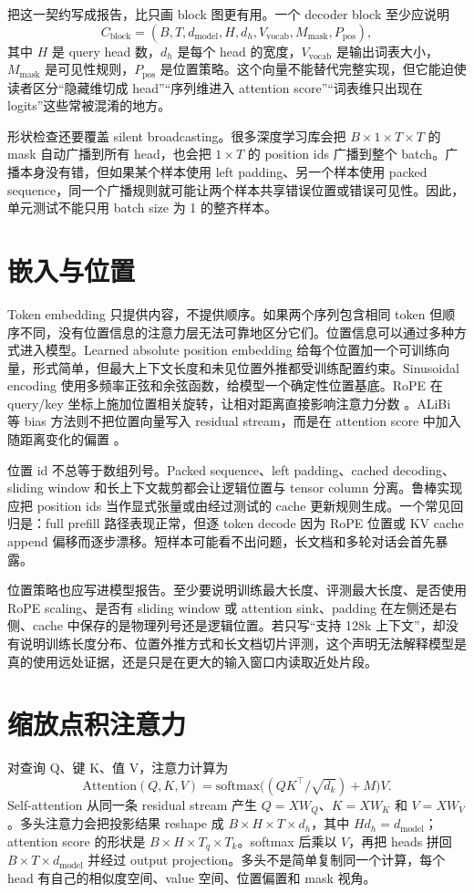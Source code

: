 \documentclass[UTF8,zihao=-4,openany]{ctexbook}
\begin{document}
把这一契约写成报告，比只画 block 图更有用。一个 decoder block 至少应说明
\[
  C_{\mathrm{block}}=(B,T,d_{\mathrm{model}},H,d_h,V_{\mathrm{vocab}},M_{\mathrm{mask}},P_{\mathrm{pos}}),
\]
其中 $H$ 是 query head 数，$d_h$ 是每个 head 的宽度，$V_{\mathrm{vocab}}$ 是输出词表大小，$M_{\mathrm{mask}}$ 是可见性规则，$P_{\mathrm{pos}}$ 是位置策略。这个向量不能替代完整实现，但它能迫使读者区分“隐藏维切成 head”“序列维进入 attention score”“词表维只出现在 logits”这些常被混淆的地方。

形状检查还要覆盖 silent broadcasting。很多深度学习库会把 $B\times1\times T\times T$ 的 mask 自动广播到所有 head，也会把 $1\times T$ 的 position ids 广播到整个 batch。广播本身没有错，但如果某个样本使用 left padding、另一个样本使用 packed sequence，同一个广播规则就可能让两个样本共享错误位置或错误可见性。因此，单元测试不能只用 batch size 为 1 的整齐样本。

\section{嵌入与位置}
Token embedding 只提供内容，不提供顺序。如果两个序列包含相同 token 但顺序不同，没有位置信息的注意力层无法可靠地区分它们。位置信息可以通过多种方式进入模型。Learned absolute position embedding 给每个位置加一个可训练向量，形式简单，但最大上下文长度和未见位置外推都受训练配置约束。Sinusoidal encoding 使用多频率正弦和余弦函数，给模型一个确定性位置基底。RoPE 在 query/key 坐标上施加位置相关旋转，让相对距离直接影响注意力分数 \cite{su2021roformer}。ALiBi 等 bias 方法则不把位置向量写入 residual stream，而是在 attention score 中加入随距离变化的偏置 \cite{press2021train}。

位置 id 不总等于数组列号。Packed sequence、left padding、cached decoding、sliding window 和长上下文裁剪都会让逻辑位置与 tensor column 分离。鲁棒实现应把 position ids 当作显式张量或由经过测试的 cache 更新规则生成。一个常见回归是：full prefill 路径表现正常，但逐 token decode 因为 RoPE 位置或 KV cache append 偏移而逐步漂移。短样本可能看不出问题，长文档和多轮对话会首先暴露。

位置策略也应写进模型报告。至少要说明训练最大长度、评测最大长度、是否使用 RoPE scaling、是否有 sliding window 或 attention sink、padding 在左侧还是右侧、cache 中保存的是物理列号还是逻辑位置。若只写“支持 128k 上下文”，却没有说明训练长度分布、位置外推方式和长文档切片评测，这个声明无法解释模型是真的使用远处证据，还是只是在更大的输入窗口内读取近处片段。

\section{缩放点积注意力}
对查询 Q、键 K、值 V，注意力计算为
\[
\mathrm{Attention}(Q,K,V)=\mathrm{softmax}\bigl((QK^\top/\sqrt{d_k})+M\bigr)V.
\]
Self-attention 从同一条 residual stream 产生 $Q=XW_Q$、$K=XW_K$ 和 $V=XW_V$。多头注意力会把投影结果 reshape 成 $B\times H\times T\times d_h$，其中 $H d_h=d_{\mathrm{model}}$；attention score 的形状是 $B\times H\times T_q\times T_k$。softmax 后乘以 $V$，再把 heads 拼回 $B\times T\times d_{\mathrm{model}}$ 并经过 output projection。多头不是简单复制同一个计算，每个 head 有自己的相似度空间、value 空间、位置偏置和 mask 视角。
\end{document}
